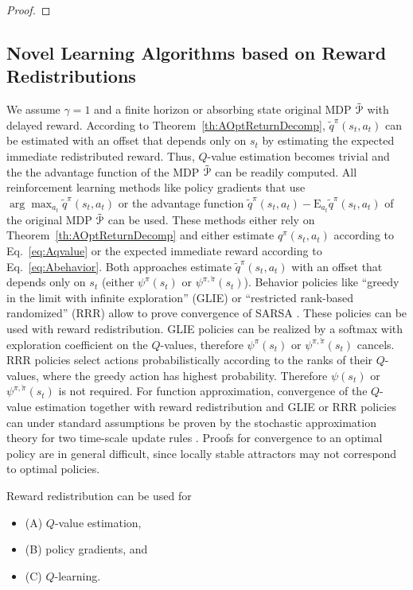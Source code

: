 \documentclass{article}
\newcommand\EXP{\mathbf{\mathrm{E}}}
\begin{document}
\begin{appendices}
\begin{proof}
\end{proof}




\subsection{Novel Learning Algorithms based on Reward Redistributions}
\label{sec:Alearning}
We assume $\gamma=1$ and a finite horizon or absorbing state
original MDP $\tilde{\mathcal{P}}$ with delayed reward.
According to Theorem~\ref{th:AOptReturnDecomp}, 
$\tilde{q}^\pi(s_t,a_t)$ can be estimated with an offset that 
depends only on $s_t$ 
by estimating the expected immediate redistributed reward.
Thus, $Q$-value estimation becomes trivial and the
the advantage function of the MDP $\tilde{\mathcal{P}}$ can be readily computed.
All reinforcement learning methods like policy gradients that use 
$\arg\max_{a_t} \tilde{q}^\pi(s_t,a_t)$ or 
the advantage function 
$\tilde{q}^\pi(s_t,a_t) - \EXP_{a_t} \tilde{q}^\pi(s_t,a_t)$
of the original MDP $\tilde{\mathcal{P}}$
can be used. These methods either rely on Theorem~\ref{th:AOptReturnDecomp}
and either estimate $q^\pi(s_t,a_t)$ according to Eq.~\eqref{eq:Aqvalue} 
or the expected immediate reward 
according to Eq.~\eqref{eq:Abehavior}. 
Both approaches estimate 
$\tilde{q}^\pi(s_t,a_t)$ with an offset 
that depends only on $s_t$ (either $\psi^{\pi}(s_t)$ 
or $\psi^{\pi,\breve{\pi}}(s_t)$).
Behavior policies like
``greedy in the limit with infinite exploration'' (GLIE) or
``restricted rank-based randomized'' (RRR) allow to prove
convergence of SARSA \cite{Singh:00}.
These policies can be used with reward redistribution.
GLIE policies can be realized by a softmax with exploration coefficient 
on the $Q$-values, 
therefore $\psi^\pi(s_t)$ or $\psi^{\pi,\breve{\pi}}(s_t)$ cancels.
RRR policies select actions probabilistically according to 
the ranks of their $Q$-values, where the 
greedy action has highest probability. Therefore $\psi(s_t)$
or $\psi^{\pi,\breve{\pi}}(s_t)$
is not required.
For function approximation, 
convergence of the $Q$-value estimation together 
with reward redistribution and GLIE or RRR policies 
can under standard assumptions be proven by the stochastic 
approximation theory for 
two time-scale update rules \cite{Borkar:97,Karmakar:17}.
Proofs for convergence to an optimal policy are in general 
difficult, since locally stable attractors 
may not correspond to optimal policies.


Reward redistribution can be used for
\begin{itemize}
\item
(A) $Q$-value estimation, 
\item
(B) policy gradients, and 
\item
(C) $Q$-learning.
\end{itemize}



\end{appendices}
\end{document}
